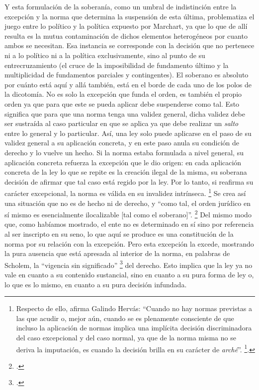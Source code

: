Y esta formulación de la soberanía, como un umbral de indistinción entre la excepción y la norma que determina la suspensión de esta última, problematiza el juego entre lo político y la política expuesto por Marchart, ya que lo que de allí resulta es la mutua contaminación de dichos elementos heterogéneos por cuanto ambos se necesitan. Esa instancia se corresponde con la decisión que no pertenece ni a lo político ni a la política exclusivamente, sino al punto de su entrecruzamiento (el cruce de la imposibilidad de fundamento último y la multiplicidad de fundamentos parciales y contingentes). El soberano es absoluto por cuánto está aquí y allá también, está en el borde de cada uno de los polos de la dicotomía. No es solo la excepción que funda el orden, es también el propio orden ya que para que este se pueda aplicar debe suspenderse como tal. Esto significa que para que una norma tenga una validez general, dicha validez debe ser sustraída al caso particular en que se aplica ya que debe realizar un \emph{salto} entre lo general y lo particular. Así, una ley solo puede aplicarse en el paso de su validez general a su aplicación concreta, y en este paso anula su condición de derecho y lo vuelve un hecho. Si la norma estaba formulada a nivel general, su aplicación concreta refuerza la excepción que le dio origen: en cada aplicación concreta de la ley lo que se repite es la creación ilegal de la misma, su soberana decisión de afirmar que tal caso está regido por la ley. Por lo tanto, si reafirma su carácter excepcional, la norma es válida en su invalidez intrínseca.
\footnote{Respecto de ello, afirma Galindo Hervás: \enquote{Cuando no hay normas previstas a las que acudir o, mejor aún, cuando se es plenamente consciente de que incluso la aplicación de normas implica una implícita decisión discriminadora del caso excepcional y del caso normal, ya que de la norma misma no se deriva la imputación, es cuando la decisión brilla en su carácter de \textit{arché}}. \footcite[56]{@7088-GALINDOHERVAS2003}.} Se crea así una situación que no es de hecho ni de derecho, y \enquote{como tal, el orden jurídico en sí mismo es esencialmente ilocalizable {[}tal como el soberano{]}}. \footcite[32]{@7101-AGAMBEN2003} Del mismo modo que, como habíamos mostrado, el ente no es determinado en sí sino por referencia al ser inscripto en su seno, lo que aquí se produce es una constitución de la norma por su relación con la excepción. Pero esta excepción la excede, mostrando la pura ausencia que está apresada al interior de la norma, en palabras de Scholem, la \enquote{vigencia sin significado} \footcite[70]{@7101-AGAMBEN2003} del derecho. Esto implica que la ley ya no vale en cuanto a su contenido sustancial, sino en cuanto a su pura forma de ley o, lo que es lo mismo, en cuanto a su pura decisión infundada.

